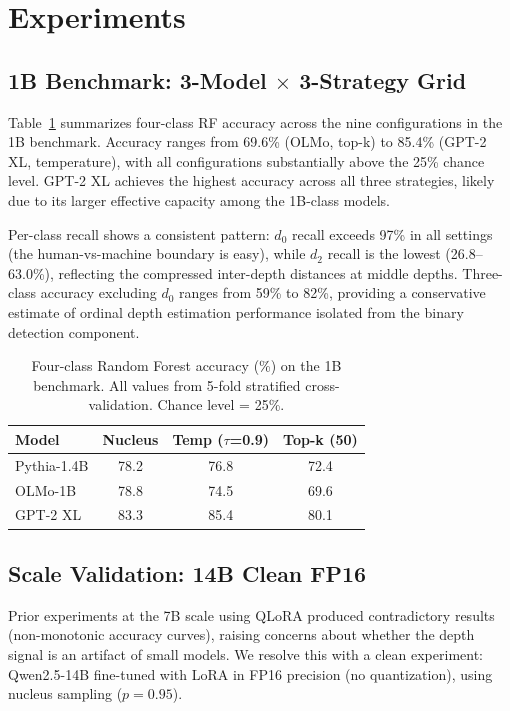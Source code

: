 \documentclass[11pt,a4paper]{article}
\begin{document}
\section{Experiments}

\subsection{1B Benchmark: 3-Model $\times$ 3-Strategy Grid}

Table~\ref{tab:benchmark} summarizes four-class RF accuracy across the nine configurations in the 1B benchmark. Accuracy ranges from 69.6\% (OLMo, top-k) to 85.4\% (GPT-2 XL, temperature), with all configurations substantially above the 25\% chance level. GPT-2 XL achieves the highest accuracy across all three strategies, likely due to its larger effective capacity among the 1B-class models.

Per-class recall shows a consistent pattern: $d_0$ recall exceeds 97\% in all settings (the human-vs-machine boundary is easy), while $d_2$ recall is the lowest (26.8--63.0\%), reflecting the compressed inter-depth distances at middle depths. Three-class accuracy excluding $d_0$ ranges from 59\% to 82\%, providing a conservative estimate of ordinal depth estimation performance isolated from the binary detection component.

\begin{table}[t]
\centering
\caption{Four-class Random Forest accuracy (\%) on the 1B benchmark. All values from 5-fold stratified cross-validation. Chance level = 25\%.}
\label{tab:benchmark}
\small
\begin{tabular}{lccc}
\toprule
\textbf{Model} & \textbf{Nucleus} & \textbf{Temp ($\tau$=0.9)} & \textbf{Top-k (50)} \\
\midrule
Pythia-1.4B & 78.2 & 76.8 & 72.4 \\
OLMo-1B & 78.8 & 74.5 & 69.6 \\
GPT-2 XL & 83.3 & 85.4 & 80.1 \\
\bottomrule
\end{tabular}
\end{table}

\subsection{Scale Validation: 14B Clean FP16}
\label{sec:scale}

Prior experiments at the 7B scale using QLoRA produced contradictory results (non-monotonic accuracy curves), raising concerns about whether the depth signal is an artifact of small models. We resolve this with a clean experiment: Qwen2.5-14B fine-tuned with LoRA in FP16 precision (no quantization), using nucleus sampling ($p=0.95$).
\end{document}
